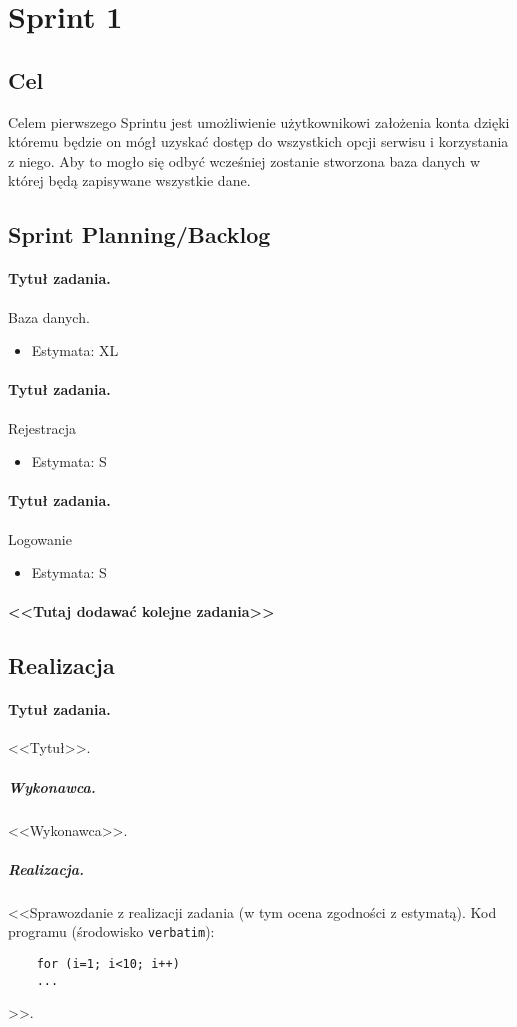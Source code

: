 \documentclass[a4paper]{article}
\begin{document}
	\section{Sprint 1}
	\subsection{Cel} Celem pierwszego Sprintu jest umożliwienie użytkownikowi założenia konta dzięki któremu będzie on mógł uzyskać dostęp do wszystkich opcji serwisu i korzystania z niego. Aby to mogło się odbyć wcześniej zostanie stworzona baza danych w której będą zapisywane wszystkie dane.
	\subsection{Sprint Planning/Backlog}
	
	\paragraph{Tytuł zadania.} Baza danych.
	\begin{itemize}
		\item Estymata: XL
	\end{itemize}
	
	\paragraph{Tytuł zadania.} Rejestracja
	\begin{itemize}
		\item Estymata: S
	\end{itemize}
	
	\paragraph{Tytuł zadania.} Logowanie
	\begin{itemize}
		\item Estymata: S
	\end{itemize}
	
	\paragraph{<<Tutaj dodawać kolejne zadania>>}
	
	\subsection{Realizacja}
	
	\paragraph{Tytuł zadania.} <<Tytuł>>.
	\subparagraph{Wykonawca.} <<Wykonawca>>.
	\subparagraph{Realizacja.} <<Sprawozdanie z realizacji zadania (w tym ocena zgodności z estymatą). Kod programu (środowisko \texttt{verbatim}): \begin{verbatim}
	for (i=1; i<10; i++)
	...
	\end{verbatim}>>.
	
\end{document}
